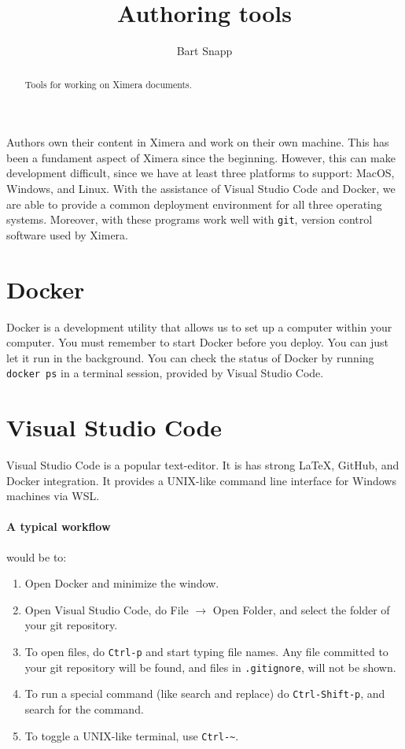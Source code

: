 \documentclass{ximera}
\title{Authoring tools}
\author{Bart Snapp}
\begin{document}
\begin{abstract}
      Tools for working on Ximera documents.
\end{abstract}
\maketitle

Authors own their content in Ximera and work on their own machine. This has
been a fundament aspect of Ximera since the beginning. However, this can make
development difficult, since we have at least three platforms to support:
MacOS, Windows, and Linux.
With the assistance of Visual Studio Code and Docker, we are able
to provide a common deployment environment for all three operating systems.
Moreover, with these programs work well with \verb!git!, version control
software used by Ximera.


\section{Docker}

Docker is a development utility that allows us to set up a computer
within your
computer. You must remember to start Docker before you deploy. You can just let
it run in the background. You can check the status of Docker by running
\verb!docker ps! in a terminal session, provided by Visual Studio Code.

\section{Visual Studio Code}

Visual Studio Code
is a popular text-editor. It is has strong \LaTeX, GitHub,
and Docker integration. It provides a UNIX-like command line interface for
Windows machines via WSL.

\paragraph{A typical workflow} would be to:
\begin{enumerate}
      \item Open Docker and minimize the window.
      \item Open Visual Studio Code, do File $\to$ Open Folder, and select the
            folder of your git repository.
      \item To open files, do \verb!Ctrl-p! and start typing file names. Any
            file
            committed to your git repository will be found, and files in
            \verb!.gitignore!, will not be shown.
      \item To run a special command (like search and replace) do
            \verb!Ctrl-Shift-p!, and search for the command.
      \item To toggle a UNIX-like terminal, use \verb!Ctrl-~!.
\end{enumerate}
\end{document}
